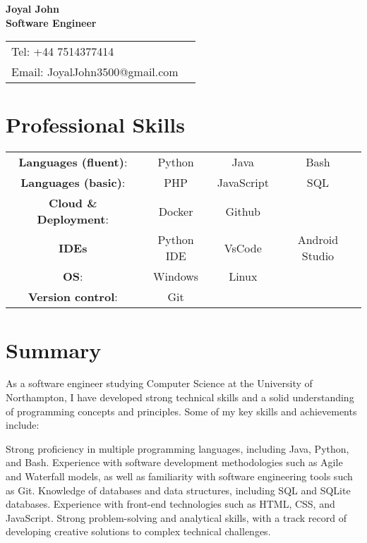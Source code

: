 \documentclass[10pt]{article}
\begin{document}
\linespread{1.0}



{\center
{\Large\bf Joyal John \\ Software Engineer \vspace{0.1in} }

\begin{center} 
\begin{tabular*}{1.0\textwidth}%
   {@{\extracolsep{\fill}}lr}
	Tel:   +44 7514377414\\
	Email: JoyalJohn3500@gmail.com \\
\end{tabular*}
\end{center}


\addtolength{\itemsep}{-1ex} \addtolength{\topsep}{-1.5ex}


\section*{\bf  Professional Skills}
\begin{center}
\begin{tabular}{c c c c}
{\bf Languages (fluent)}: & Python & Java & Bash\\
{\bf Languages (basic)}: &  PHP & JavaScript & SQL\\
{\bf Cloud \& Deployment}: & Docker & Github\\
{\bf IDEs} & Python IDE & VsCode & Android Studio \\
{\bf OS}: & Windows & Linux \\
{\bf Version control}: & Git \\

\end{tabular}
\end{center}


\section*{\bf Summary}

As a software engineer studying Computer Science at the University of Northampton, I have developed strong technical skills and a solid understanding of programming concepts and principles. Some of my key skills and achievements include:

Strong proficiency in multiple programming languages, including Java, Python, and Bash.
Experience with software development methodologies such as Agile and Waterfall models, as well as familiarity with software engineering tools such as Git.
Knowledge of databases and data structures, including SQL and SQLite databases.
Experience with front-end technologies such as HTML, CSS, and JavaScript.
Strong problem-solving and analytical skills, with a track record of developing creative solutions to complex technical challenges.

}
\end{document}
